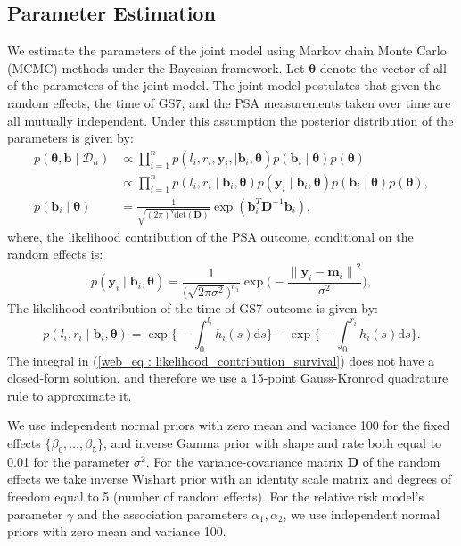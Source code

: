 \subsection{Parameter Estimation}
We estimate the parameters of the joint model using Markov chain Monte Carlo (MCMC) methods under the Bayesian framework. Let $\boldsymbol{\theta}$ denote the vector of all of the parameters of the joint model. The joint model postulates that given the random effects, the time of GS7, and the PSA measurements taken over time are all mutually independent. Under this assumption the posterior distribution of the parameters is given by:
\begin{align*}
p(\boldsymbol{\theta}, \boldsymbol{b} \mid \mathcal{D}_n) & \propto \prod_{i=1}^n p(l_i, r_i, \boldsymbol{y}_{i}, \mid \boldsymbol{b}_i, \boldsymbol{\theta}) p(\boldsymbol{b}_i \mid \boldsymbol{\theta}) p(\boldsymbol{\theta})\\
& \propto \prod_{i=1}^n p(l_i, r_i \mid \boldsymbol{b}_i, \boldsymbol{\theta}) p(\boldsymbol{y}_{i} \mid \boldsymbol{b}_i, \boldsymbol{\theta}) p(\boldsymbol{b}_i \mid \boldsymbol{\theta}) p(\boldsymbol{\theta}),\\
p(\boldsymbol{b}_i \mid \boldsymbol{\theta}) &= \frac{1}{\sqrt{(2 \pi)^q \text{det}(\boldsymbol{D})}} \exp(\boldsymbol{b}_i^T \boldsymbol{D}^{-1} \boldsymbol{b}_i),
\end{align*}
where, the likelihood contribution of the PSA outcome, conditional on the random effects is:
\begin{equation*}
p(\boldsymbol{y}_{i} \mid \boldsymbol{b}_i, \boldsymbol{\theta}) = \frac{1}{\big(\sqrt{2 \pi \sigma^2}\big)^{n_{i}}} \exp\bigg(-\frac{{\lVert{\boldsymbol{y}_{i} - \boldsymbol{m}_{i}}\rVert}^2}{\sigma^2}\bigg),
\end{equation*}
The likelihood contribution of the time of GS7 outcome is given by:
\begin{equation}
\label{web_eq : likelihood_contribution_survival}
p(l_i,r_i\mid \boldsymbol{b}_i,\boldsymbol{\theta}) = \exp\Big\{-\int_0^{l_i} h_i(s)\mathrm{d}{s}\Big\} - \exp\Big\{-\int_0^{r_i}h_i(s)\mathrm{d}{s}\Big\}.
\end{equation}
The integral in (\ref{web_eq : likelihood_contribution_survival}) does not have a closed-form solution, and therefore we use a 15-point Gauss-Kronrod quadrature rule to approximate it.

We use independent normal priors with zero mean and variance 100 for the fixed effects $\{\beta_{0},\ldots,\beta_{5}\}$, and inverse Gamma prior with shape and rate both equal to 0.01 for the parameter $\sigma^2$. For the variance-covariance matrix $\boldsymbol{D}$ of the random effects we take inverse Wishart prior with an identity scale matrix and degrees of freedom equal to 5 (number of random effects). For the relative risk model's parameter $\gamma$ and the association parameters $\alpha_{1}, \alpha_{2}$, we use independent normal priors with zero mean and variance 100.

